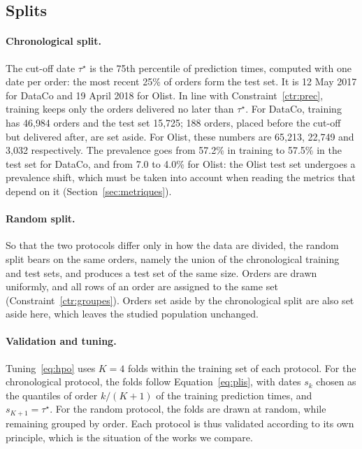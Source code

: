\documentclass[11pt,a4paper]{article}
\theoremstyle{definition}
\begin{document}
\subsection{Splits}
\label{sec:partitions}

\paragraph{Chronological split.} The cut-off date $\tau^\star$ is the 75th percentile of prediction times, computed with one date per order: the most recent 25\% of orders form the test set. It is 12 May 2017 for DataCo and 19 April 2018 for Olist. In line with Constraint~\ref{ctr:prec}, training keeps only the orders delivered no later than $\tau^\star$. For DataCo, training has 46{,}984 orders and the test set 15{,}725; 188 orders, placed before the cut-off but delivered after, are set aside. For Olist, these numbers are 65{,}213, 22{,}749 and 3{,}032 respectively. The prevalence goes from 57.2\% in training to 57.5\% in the test set for DataCo, and from 7.0 to 4.0\% for Olist: the Olist test set undergoes a prevalence shift, which must be taken into account when reading the metrics that depend on it (Section~\ref{sec:metriques}).

\paragraph{Random split.} So that the two protocols differ only in how the data are divided, the random split bears on the same orders, namely the union of the chronological training and test sets, and produces a test set of the same size. Orders are drawn uniformly, and all rows of an order are assigned to the same set (Constraint~\ref{ctr:groupes}). Orders set aside by the chronological split are also set aside here, which leaves the studied population unchanged.

\paragraph{Validation and tuning.} Tuning~\eqref{eq:hpo} uses $K = 4$ folds within the training set of each protocol. For the chronological protocol, the folds follow Equation~\eqref{eq:plis}, with dates $s_k$ chosen as the quantiles of order $k/(K+1)$ of the training prediction times, and $s_{K+1} = \tau^\star$. For the random protocol, the folds are drawn at random, while remaining grouped by order. Each protocol is thus validated according to its own principle, which is the situation of the works we compare.
\end{document}
